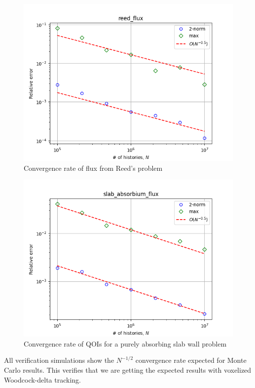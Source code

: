 \begin{figure}
  \centering
  \includegraphics[scale=0.75]{monte_carlo/delta_tracking/figures/verification/reed/reed_flux.png}
  \caption{Convergence rate of flux from Reed's problem \cite{reed_difference_1971}}
  \label{fig:reeds}
\end{figure}
\begin{figure}
    \centering
    \includegraphics[width=0.75\linewidth]{monte_carlo/delta_tracking/figures/verification/abs_slab/slab_absorbium_flux.png}
    \caption{Convergence rate of QOIs for a purely absorbing slab wall problem}
    \label{fig:abs_slab}
\end{figure}

All verification simulations show the $N^{-1/2}$ convergence rate expected for Monte Carlo results.
This verifies that we are getting the expected results with voxelized Woodcock-delta tracking.



